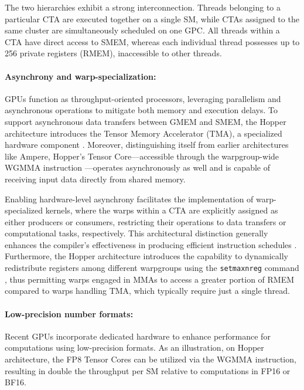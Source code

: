 \begin{enumerate}
The two hierarchies exhibit a strong interconnection. Threads belonging to a particular CTA are executed together on a single SM, while CTAs assigned to the same cluster are simultaneously scheduled on one GPC. All threads within a CTA have direct access to SMEM, whereas each individual thread possesses up to 256 private registers (RMEM), inaccessible to other threads.

\paragraph{Asynchrony and warp-specialization:}

GPUs function as throughput-oriented processors, leveraging parallelism and asynchronous operations to mitigate both memory and execution delays. To support asynchronous data transfers between GMEM and SMEM, the Hopper architecture introduces the Tensor Memory Accelerator (TMA), a specialized hardware component \cite[\S7.29]{cuda}. Moreover, distinguishing itself from earlier architectures like Ampere, Hopper’s Tensor Core—accessible through the warpgroup-wide WGMMA instruction \cite[\S9.7.14]{ptx}—operates asynchronously as well and is capable of receiving input data directly from shared memory.

Enabling hardware-level asynchrony facilitates the implementation of warp-specialized kernels, where the warps within a CTA are explicitly assigned as either producers or consumers, restricting their operations to data transfers or computational tasks, respectively. This architectural distinction generally enhances the compiler's effectiveness in producing efficient instruction schedules \citep{warp-specialization-2011}. Furthermore, the Hopper architecture introduces the capability to dynamically redistribute registers among different warpgroups using the \verb|setmaxnreg| command \cite[\S9.7.17.1]{ptx}, thus permitting warps engaged in MMAs to access a greater portion of RMEM compared to warps handling TMA, which typically require just a single thread.

\paragraph{Low-precision number formats:}
\label{sec:low-precision-gpu}
Recent GPUs incorporate dedicated hardware to enhance performance for computations using low-precision formats. As an illustration, on Hopper architecture, the FP8 Tensor Cores can be utilized via the WGMMA instruction, resulting in double the throughput per SM relative to computations in FP16 or BF16.


\end{enumerate}
